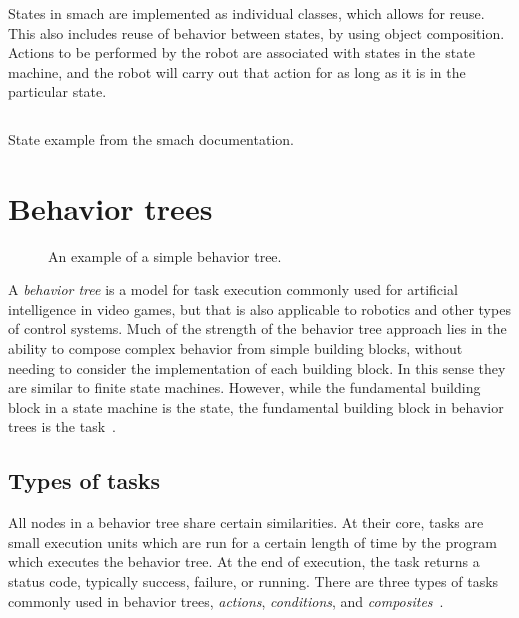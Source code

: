 \documentclass[\rootfolder/main.tex]{subfiles}
\begin{document}
States in \acrshort{smach} are implemented as individual classes, which allows for reuse.
This also includes reuse of behavior between states, by using object composition.
Actions to be performed by the robot are associated with states in the state machine, and the robot will carry out that action for as long as it is in the particular state.

\begin{listing}
\inputminted{python}{\rootfolder/Chapters/Chapter2/Listings/smachstate.py}
\caption{State example from the \acrshort{smach} documentation.}
\end{listing}


\section{Behavior trees}

\begin{wrapfigure}{L}{0.5\columnwidth}
    \caption{An example of a simple behavior tree.}
    \label{fig:behaviortree}
\end{wrapfigure}

A \emph{behavior tree} is a model for task execution commonly used for artificial intelligence in video games, but that is also applicable to robotics and other types of control systems.
Much of the strength of the behavior tree approach lies in the ability to compose complex behavior from simple building blocks, without needing to consider the implementation of each building block.
In this sense they are similar to finite state machines.
However, while the fundamental building block in a state machine is the state, the fundamental building block in behavior trees is the task~\cite{Millington2009}.


\subsection{Types of tasks}

All nodes in a behavior tree share certain similarities.
At their core, tasks are small execution units which are run for a certain length of time by the program which executes the behavior tree.
At the end of execution, the task returns a status code, typically success, failure, or running.
There are three types of tasks commonly used in behavior trees, \emph{actions}, \emph{conditions}, and \emph{composites}~\cite{Millington2009}.
\end{document}

